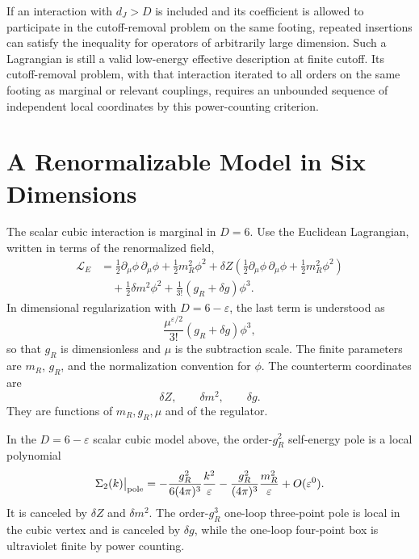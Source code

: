 If an interaction with \(d_J>D\) is included and its coefficient is allowed to
participate in the cutoff-removal problem on the same footing, repeated
insertions can satisfy the inequality for operators of arbitrarily large
dimension.  Such a Lagrangian is still a valid low-energy effective
description at finite cutoff.  Its cutoff-removal problem, with that
interaction iterated to all orders on the same footing as marginal or relevant
couplings, requires an unbounded sequence of independent local coordinates by
this power-counting criterion.

\section{A Renormalizable Model in Six Dimensions}

The scalar cubic interaction is marginal in \(D=6\).  Use the Euclidean
Lagrangian, written in terms of the renormalized field,
\[
\begin{aligned}
  \mathcal L_E
  &=
  \frac12\partial_{\mu}\phi\,\partial_{\mu}\phi
  +
  \frac12 m_R^2\phi^2
  +
  \delta Z
  \left(
    \frac12\partial_{\mu}\phi\,\partial_{\mu}\phi
    +
    \frac12 m_R^2\phi^2
  \right)          \\
  &\quad
  +
  \frac12\delta m^2\phi^2
  +
  \frac1{3!}(g_R+\delta g)\phi^3 .
\end{aligned}
\]
In dimensional regularization with \(D=6-\varepsilon\), the last term is
understood as
\[
  \frac{\mu^{\varepsilon/2}}{3!}(g_R+\delta g)\phi^3,
\]
so that \(g_R\) is dimensionless and \(\mu\) is the subtraction scale.  The
finite parameters are \(m_R\), \(g_R\), and the normalization convention for
\(\phi\).  The counterterm coordinates are
\[
  \delta Z,\qquad \delta m^2,\qquad \delta g .
\]
They are functions of \(m_R,g_R,\mu\) and of the regulator.

\begin{lemma}
\label{lem:six-dimensional-phi-three-one-loop-local-poles}
In the \(D=6-\varepsilon\) scalar cubic model above, the order-\(g_R^2\)
self-energy pole is a local polynomial
\[
  \Sigma_2(k)\big|_{\rm pole}
  =
  -\frac{g_R^2}{6(4\pi)^3}\frac{k^2}{\varepsilon}
  -
  \frac{g_R^2}{(4\pi)^3}\frac{m_R^2}{\varepsilon}
  +O(\varepsilon^0).
\]
It is canceled by \(\delta Z\) and \(\delta m^2\).  The order-\(g_R^3\)
one-loop three-point pole is local in the cubic vertex and is canceled by
\(\delta g\), while the one-loop four-point box is ultraviolet finite by
power counting.
\end{lemma}

